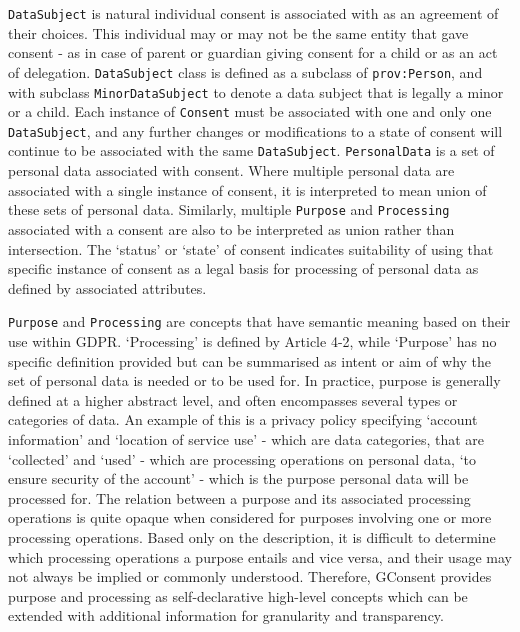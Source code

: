 \texttt{DataSubject} is natural individual consent is associated with as an agreement of their choices. This individual may or may not be the same entity that gave consent - as in case of parent or guardian giving consent for a child or as an act of delegation. \texttt{DataSubject} class is defined as a subclass of \texttt{prov:Person}, and with subclass \texttt{MinorDataSubject} to denote a data subject that is legally a minor or a child.
Each instance of \texttt{Consent} must be associated with one and only one \texttt{DataSubject}, and any further changes or modifications to a state of consent will continue to be associated with the same \texttt{DataSubject}.
\texttt{PersonalData} is a set of personal data associated with consent. Where multiple personal data are associated with a single instance of consent, it is interpreted to mean union of these sets of personal data. Similarly, multiple \texttt{Purpose} and \texttt{Processing} associated with a consent are also to be interpreted as union rather than intersection.
The `status' or `state' of consent indicates suitability of using that specific instance of consent as a legal basis for processing of personal data as defined by associated attributes.

\texttt{Purpose} and \texttt{Processing} are concepts that have semantic meaning based on their use within GDPR.
`Processing' is defined by Article 4-2, while `Purpose' has no specific definition provided but can be summarised as intent or aim of why the set of personal data is needed or to be used for. In practice, purpose is generally defined at a higher abstract level, and often encompasses several types or categories of data. An example of this is a privacy policy specifying `account information' and `location of service use' - which are data categories, that are `collected' and `used' - which are processing operations on personal data, `to ensure security of the account' - which is the purpose personal data will be processed for. The relation between a purpose and its associated processing operations is quite opaque when considered for purposes involving one or more processing operations. Based only on the description, it is difficult to determine which processing operations a purpose entails and vice versa, and their usage may not always be implied or commonly understood. Therefore, GConsent provides purpose and processing as self-declarative high-level concepts which can be extended with additional information for granularity and transparency.

